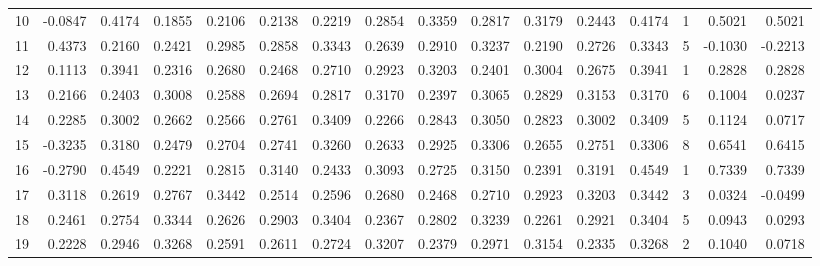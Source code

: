 \begin{tabular}{lrrrrrrrrrrrrrrr}
10 &     -0.0847 &  0.4174 &  0.1855 &  0.2106 &  0.2138 &  0.2219 &  0.2854 &  0.3359 &  0.2817 &  0.3179 &   0.2443 &     0.4174 &      1 &                    0.5021 &                     0.5021 \\
11 &      0.4373 &  0.2160 &  0.2421 &  0.2985 &  0.2858 &  0.3343 &  0.2639 &  0.2910 &  0.3237 &  0.2190 &   0.2726 &     0.3343 &      5 &                   -0.1030 &                    -0.2213 \\
12 &      0.1113 &  0.3941 &  0.2316 &  0.2680 &  0.2468 &  0.2710 &  0.2923 &  0.3203 &  0.2401 &  0.3004 &   0.2675 &     0.3941 &      1 &                    0.2828 &                     0.2828 \\
13 &      0.2166 &  0.2403 &  0.3008 &  0.2588 &  0.2694 &  0.2817 &  0.3170 &  0.2397 &  0.3065 &  0.2829 &   0.3153 &     0.3170 &      6 &                    0.1004 &                     0.0237 \\
14 &      0.2285 &  0.3002 &  0.2662 &  0.2566 &  0.2761 &  0.3409 &  0.2266 &  0.2843 &  0.3050 &  0.2823 &   0.3002 &     0.3409 &      5 &                    0.1124 &                     0.0717 \\
15 &     -0.3235 &  0.3180 &  0.2479 &  0.2704 &  0.2741 &  0.3260 &  0.2633 &  0.2925 &  0.3306 &  0.2655 &   0.2751 &     0.3306 &      8 &                    0.6541 &                     0.6415 \\
16 &     -0.2790 &  0.4549 &  0.2221 &  0.2815 &  0.3140 &  0.2433 &  0.3093 &  0.2725 &  0.3150 &  0.2391 &   0.3191 &     0.4549 &      1 &                    0.7339 &                     0.7339 \\
17 &      0.3118 &  0.2619 &  0.2767 &  0.3442 &  0.2514 &  0.2596 &  0.2680 &  0.2468 &  0.2710 &  0.2923 &   0.3203 &     0.3442 &      3 &                    0.0324 &                    -0.0499 \\
18 &      0.2461 &  0.2754 &  0.3344 &  0.2626 &  0.2903 &  0.3404 &  0.2367 &  0.2802 &  0.3239 &  0.2261 &   0.2921 &     0.3404 &      5 &                    0.0943 &                     0.0293 \\
19 &      0.2228 &  0.2946 &  0.3268 &  0.2591 &  0.2611 &  0.2724 &  0.3207 &  0.2379 &  0.2971 &  0.3154 &   0.2335 &     0.3268 &      2 &                    0.1040 &                     0.0718 \\
\bottomrule
\end{tabular}
